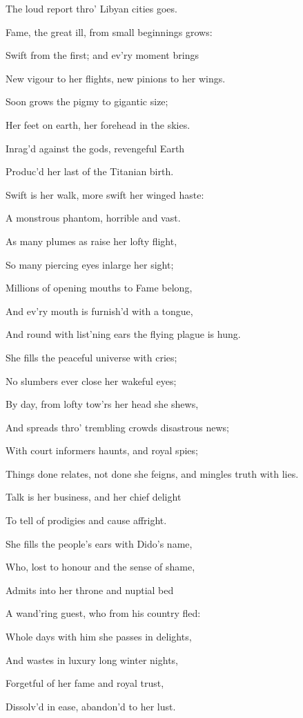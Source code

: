 The loud report thro’ Libyan cities goes.

Fame, the great ill, from small beginnings grows:

Swift from the first; and ev’ry moment brings

New vigour to her flights, new pinions to her wings.

Soon grows the pigmy to gigantic size;

Her feet on earth, her forehead in the skies.

Inrag’d against the gods, revengeful Earth

Produc’d her last of the Titanian birth.

Swift is her walk, more swift her winged haste:

A monstrous phantom, horrible and vast.

As many plumes as raise her lofty flight,

So many piercing eyes inlarge her sight;

Millions of opening mouths to Fame belong,

And ev’ry mouth is furnish’d with a tongue,

And round with list’ning ears the flying plague is hung.

She fills the peaceful universe with cries;

No slumbers ever close her wakeful eyes;

By day, from lofty tow’rs her head she shews,

And spreads thro’ trembling crowds disastrous news;

With court informers haunts, and royal spies;

Things done relates, not done she feigns, and mingles truth with lies.

Talk is her business, and her chief delight

To tell of prodigies and cause affright.

She fills the people’s ears with Dido’s name,

Who, lost to honour and the sense of shame,

Admits into her throne and nuptial bed

A wand’ring guest, who from his country fled:

Whole days with him she passes in delights,

And wastes in luxury long winter nights,

Forgetful of her fame and royal trust,

Dissolv’d in ease, abandon’d to her lust.

